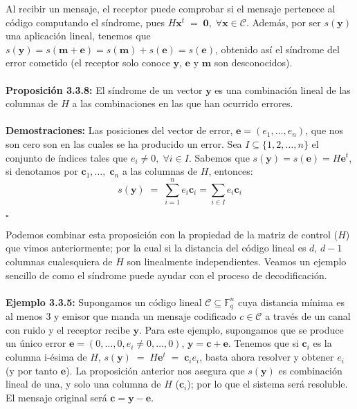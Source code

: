 \documentclass[11pt,spanish]{book}
\newcommand{\qed}{\begin{flushright} $\square$ \end{flushright}}
\begin{document}
Al recibir un mensaje, el receptor puede comprobar si el mensaje pertenece al código computando el síndrome, pues $H\textbf{x}^{t}\;=\;\mathbf{0},\;\forall \mathbf{x}\in\mathcal{C}$. Además, por ser $s(\mathbf{y})$ una aplicación lineal, tenemos que $s(\mathbf{y})=s(\mathbf{m}+\mathbf{e})=s(\mathbf{m})+s(\mathbf{e})=s(\mathbf{e})$, obtenido así el síndrome del error cometido (el receptor solo conoce $\mathbf{y}$, $\mathbf{e}$ y $\mathbf{m}$ son desconocidos).\\
\\ \textbf{Proposición 3.3.8: } El síndrome de un vector $\mathbf{y}$ es una combinación lineal de las columnas de $H$ a las combinaciones en las que han ocurrido errores.\\
\\ \textbf{Demostraciones: } Las posiciones del vector de error, $\mathbf{e}=(e_1,\ldots,e_n)$, que nos son cero son en las cuales se ha producido un error. Sea $I\subseteq \{1,2,\ldots,n\}$ el conjunto de índices tales que $e_{i}\neq 0,\;\forall i\in I$. Sabemos que $s(\mathbf{y})=s(\mathbf{e})=H\mathbf{e}^{t}$, si denotamos por $\mathbf{c}_1,\ldots,\;\mathbf{c}_n$ a las columnas de $H$, entonces:
$$s(\mathbf{y})\;=\;\sum_{i=1}^{n}e_{i}\mathbf{c}_{i}=\sum_{i\in I}e_{i}\mathbf{c}_{i}$$
\qed

Podemos combinar esta proposición con la propiedad de la matriz de control ($H$) que vimos anteriormente; por la cual si la distancia del código lineal es $d$, $d-1$ columnas cualesquiera de $H$ son linealmente independientes. Veamos un ejemplo sencillo de como el síndrome puede ayudar con  el proceso de decodificación.\\
\\ \textbf{Ejemplo 3.3.5: } Supongamos un código lineal $\mathcal{C}\subseteq \mathbb{F}_{q}^{n}$ cuya distancia mínima es al menos $3$ y emisor que manda un mensaje codificado $c\in \mathcal{C}$ a través de un canal con ruido y el receptor recibe $\mathbf{y}$. Para este ejemplo, supongamos que se produce un único error $\mathbf{e}=(0,\ldots ,0,e_{i}\neq 0,\ldots ,0)$, $\mathbf{y}=\mathbf{c}+\mathbf{e}$. Tenemos que si $\mathbf{c}_i$ es la columna i-ésima de $H$, $s(\mathbf{y})\; =\; H\mathbf{e}^{t}\; =\;\mathbf{c}_{i} e_{i}$, basta ahora resolver y obtener $e_{i}$ (y por tanto $\mathbf{e}$). La proposición anterior nos asegura que $s(\mathbf{y})$ es combinación lineal de una, y solo una columna de $H$ ($\mathbf{c}_i$); por lo que el sistema será resoluble. El mensaje original será $\mathbf{c}=\mathbf{y}-\mathbf{e}$.\\
\end{document}
